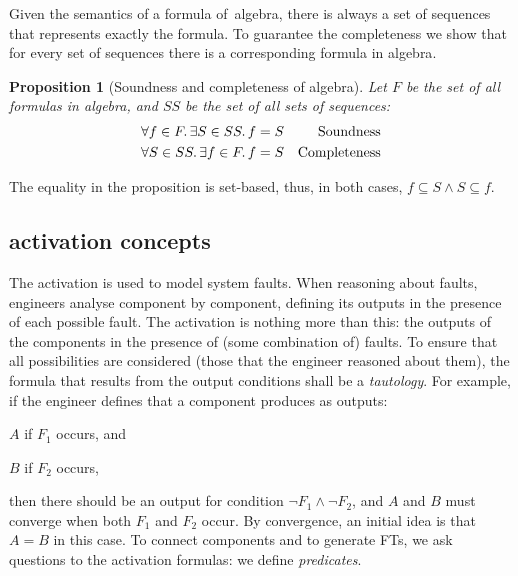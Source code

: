 \documentclass[12pt,openright,twoside,a4paper,oldfontcommands,english,brazil,final]{abntex2}
\theoremstyle{theo}
\newtheorem{proposition}{Proposition}[chapter]
\begin{document}

Given the semantics of a formula of~\ac{algebra}, there is always a set of sequences that represents exactly the formula.
To guarantee the completeness we show that for every set of sequences there is a corresponding formula in \ac{algebra}.

\begin{proposition}[Soundness and completeness of \ac{algebra}]
Let $F$ be the set of all formulas in \ac{algebra}, and $SS$ be the set of all sets of sequences:
%
\begin{subequations}
  \begin{align}
    \forall f \in F \ldotp \exists S \in SS \ldotp f & = S & \text{Soundness}\\
    \forall S \in SS \ldotp \exists f \in F \ldotp f & = S & \text {Completeness}
  \end{align}
\end{subequations}
\end{proposition}
%
The equality in the proposition is set-based, thus, in both cases, $f \subseteq S \land S \subseteq f$.

\subsection{\acs*{activation} concepts}
\label{sec:activation}

The \acf{activation} is used to model system faults.
When reasoning about faults, engineers analyse component by component, defining its outputs in the presence of each possible fault.
The \ac{activation} is nothing more than this: the outputs of the components in the presence of (some combination of) faults.
To ensure that all possibilities are considered (those that the engineer reasoned about them), the formula that results from the output conditions shall be a \emph{tautology}.
For example, if the engineer defines that a component produces as outputs:
\begin{alineasinline}
  \item $A$ if $F_1$ occurs, and
  \item $B$ if $F_2$ occurs,
\end{alineasinline}
then there should be an output for condition $\lnot F_1 \land \lnot F_2$, and $A$ and $B$ must converge when both $F_1$ and $F_2$ occur.
By convergence, an initial idea is that $A = B$ in this case.
To connect components and to generate \acp{FT}, we ask questions to the \ac{activation} formulas: we define \emph{predicates}.
\end{document}
